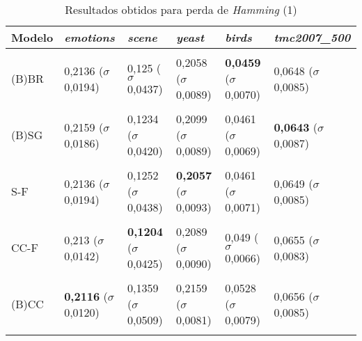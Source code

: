 
\begin{table}[htbp]
	\centering
	\caption{Resultados obtidos para perda de \textit{{Hamming}} (1)}
		\begin{tabular}
        { p{0.88in} p{0.88in} p{0.88in} p{0.88in} p{0.88in} p{0.88in} }
        
        \hline
Modelo & \textit{emotions} & \textit{scene} & \textit{yeast} & \textit{birds} & \textit{tmc2007\_500} \\ 
\hline \\

(B)BR & 0,2136 \newline ($\sigma$ 0,0194) & 0,125 \newline ($\sigma$ 0,0437) & 0,2058 \newline ($\sigma$ 0,0089) & \textbf{0,0459} \newline ($\sigma$ 0,0070) & 0,0648 \newline ($\sigma$ 0,0085) \\ \\
(B)SG & 0,2159 \newline ($\sigma$ 0,0186) & 0,1234 \newline ($\sigma$ 0,0420) & 0,2099 \newline ($\sigma$ 0,0089) & 0,0461 \newline ($\sigma$ 0,0069) & \textbf{0,0643} \newline ($\sigma$ 0,0087) \\ \\
S-F & 0,2136 \newline ($\sigma$ 0,0194) & 0,1252 \newline ($\sigma$ 0,0438) & \textbf{0,2057} \newline ($\sigma$ 0,0093) & 0,0461 \newline ($\sigma$ 0,0071) & 0,0649 \newline ($\sigma$ 0,0085) \\ \\
CC-F & 0,213 \newline ($\sigma$ 0,0142) & \textbf{0,1204} \newline ($\sigma$ 0,0425) & 0,2089 \newline ($\sigma$ 0,0090) & 0,049 \newline ($\sigma$ 0,0066) & 0,0655 \newline ($\sigma$ 0,0083) \\ \\
(B)CC & \textbf{0,2116} \newline ($\sigma$ 0,0120) & 0,1359 \newline ($\sigma$ 0,0509) & 0,2159 \newline ($\sigma$ 0,0081) & 0,0528 \newline ($\sigma$ 0,0079) & 0,0656 \newline ($\sigma$ 0,0085) \\ \\

\end{tabular}
\end{table}
